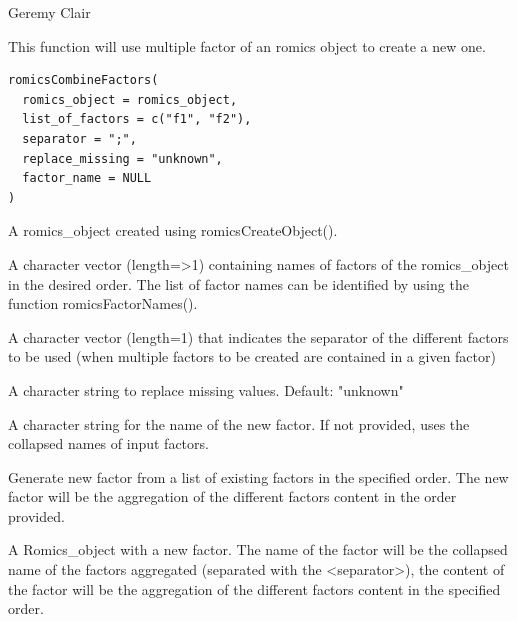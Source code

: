 \documentclass[a4paper]{book}
\begin{document}
%
\begin{Author}
Geremy Clair
\end{Author}
%
\begin{Description}
This function will use multiple factor of an romics object to create a new one.
\end{Description}
%
\begin{Usage}
\begin{verbatim}
romicsCombineFactors(
  romics_object = romics_object,
  list_of_factors = c("f1", "f2"),
  separator = ";",
  replace_missing = "unknown",
  factor_name = NULL
)
\end{verbatim}
\end{Usage}
%
\begin{Arguments}
\begin{ldescription}
\item[\code{romics\_object}] A romics\_object created using romicsCreateObject().

\item[\code{list\_of\_factors}] A character vector (length=>1) containing names of factors of the romics\_object in the desired order. The list of factor names can be identified by using the function romicsFactorNames().

\item[\code{separator}] A character vector (length=1) that indicates the separator of the different factors to be used (when multiple factors to be created are contained in a given factor)

\item[\code{replace\_missing}] A character string to replace missing values. Default: "unknown"

\item[\code{factor\_name}] A character string for the name of the new factor. If not provided, uses the collapsed names of input factors.
\end{ldescription}
\end{Arguments}
%
\begin{Details}
Generate new factor from a list of existing factors in the specified order. The new factor will be the aggregation of the different factors content in the order provided.
\end{Details}
%
\begin{Value}
A Romics\_object with a new factor. The name of the factor will be the collapsed name of the factors aggregated (separated with the <separator>), the content of the factor will be the aggregation of the different factors content in the specified order.
\end{Value}
\end{document}
